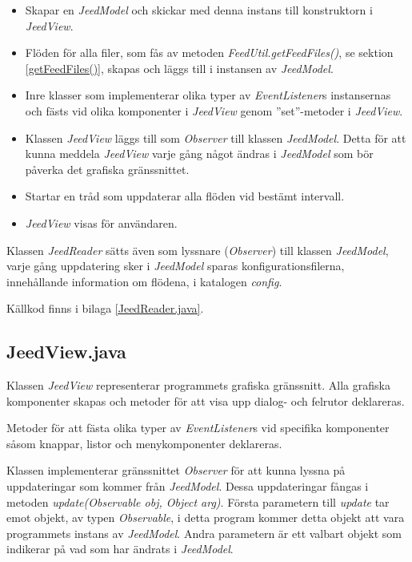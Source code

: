 \documentclass[titlepage, twoside, a4paper, 12pt]{article}
\begin{document}
\begin{itemize}
\item Skapar en \textit{JeedModel} och skickar med denna instans till
  konstruktorn i \textit{JeedView}.

\item Flöden för alla filer, som fås av metoden
  \textit{FeedUtil.getFeedFiles()}, se sektion \ref{getFeedFiles()},
  skapas och läggs till i instansen av \textit{JeedModel}.

\item Inre klasser som implementerar olika typer av
  \textit{EventListener}s instansernas och fästs vid olika komponenter
  i \textit{JeedView} genom ''set''-metoder i \textit{JeedView}.

\item Klassen \textit{JeedView} läggs till som \textit{Observer} till
  klassen \textit{JeedModel}. Detta för att kunna meddela
  \textit{JeedView} varje gång något ändras i \textit{JeedModel} som
  bör påverka det grafiska gränssnittet.

\item Startar en tråd som uppdaterar alla flöden vid bestämt
  intervall.
  
\item \textit{JeedView} visas för användaren.
\end{itemize}

Klassen \textit{JeedReader} sätts även som lyssnare
(\textit{Observer}) till klassen \textit{JeedModel}, varje gång
uppdatering sker i \textit{JeedModel} sparas konfigurationsfilerna,
innehållande information om flödena, i katalogen \textit{config}.

Källkod finns i bilaga \ref{JeedReader.java}.

\subsection{JeedView.java}\label{JeedView}
Klassen \textit{JeedView} representerar programmets grafiska
gränssnitt. Alla grafiska komponenter skapas och metoder för att visa
upp dialog- och felrutor deklareras.

Metoder för att fästa olika typer av \textit{EventListener}s vid
specifika komponenter såsom knappar, listor och menykomponenter
deklareras.

Klassen implementerar gränssnittet \textit{Observer} för att kunna
lyssna på uppdateringar som kommer från \textit{JeedModel}. Dessa
uppdateringar fångas i metoden \textit{update(Observable obj, Object
  arg)}. Första parametern till \textit{update} tar emot objekt, av
typen \textit{Observable}, i detta program kommer detta objekt att
vara programmets instans av \textit{JeedModel}. Andra parametern är
ett valbart objekt som indikerar på vad som har ändrats i
\textit{JeedModel}. %
\end{document}
